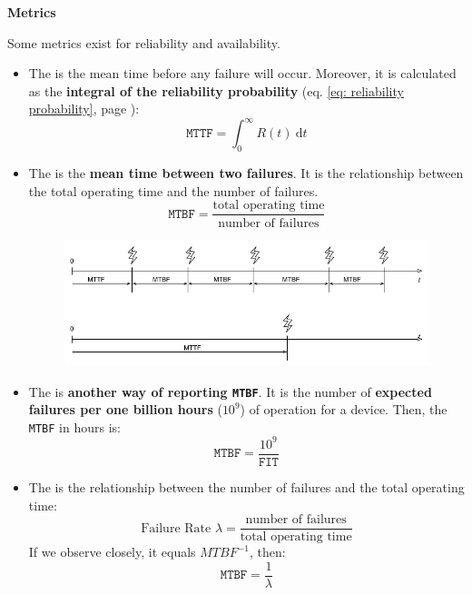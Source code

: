 \begin{flushleft}
    \textcolor{Red2}{ \textbf{Metrics}}
\end{flushleft}
Some metrics exist for reliability and availability.
\begin{itemize}
    \item The  is the mean time before any failure will occur. Moreover, it is calculated as the \textbf{integral of the reliability probability} (eq. \ref{eq: reliability probability}, page \pageref{eq: reliability probability}):
    \begin{equation}
        \texttt{MTTF} = \displaystyle\int_{0}^{\infty} R\left(t\right) \:\mathrm{d}t
    \end{equation}
    
    \item The  is the \textbf{mean time between two failures}. It is the relationship between the total operating time and the number of failures.
    \begin{equation}
        \texttt{MTBF} = \dfrac{\text{total operating time}}{\text{number of failures}}
    \end{equation}
    \begin{figure}[!htp]
        \centering
        \includegraphics[width=\textwidth]{img/reliability-and-availability-1.png}
    \end{figure}
    
    \item The  is \textbf{another way of reporting \texttt{MTBF}}. It is the number of \textbf{expected failures per one billion hours} ($10^9$) of operation for a device. Then, the \texttt{MTBF} in hours is:
    \begin{equation}
        \texttt{MTBF} = \dfrac{10^{9}}{\texttt{FIT}}
    \end{equation}
    
    \item The  is the relationship between the number of failures and the total operating time:
    \begin{equation}
        \text{Failure Rate }\lambda = \dfrac{\text{number of failures}}{\text{total operating time}}
    \end{equation}
    If we observe closely, it equals $MTBF^{-1}$, then:
    \begin{equation}
        \texttt{MTBF} = \dfrac{1}{\lambda}
    \end{equation}
\end{itemize}

